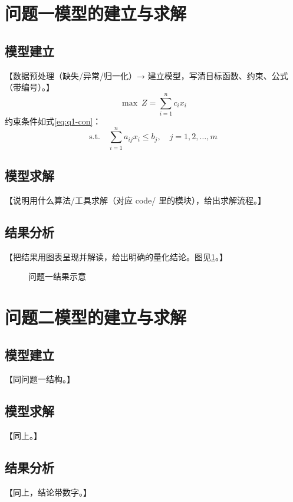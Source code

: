 \documentclass{cumcmthesis}
\begin{document}
\section{问题一模型的建立与求解}
\subsection{模型建立}
【数据预处理（缺失/异常/归一化）→ 建立模型，写清目标函数、约束、公式（带编号）。】
\begin{equation}
    \max\ Z = \sum_{i=1}^{n} c_i x_i
    \label{eq:q1-obj}
\end{equation}
约束条件如式\cref{eq:q1-con}：
\begin{equation}
    \text{s.t.}\quad \sum_{i=1}^{n} a_{ij} x_i \le b_j,\quad j=1,2,\dots,m
    \label{eq:q1-con}
\end{equation}

\subsection{模型求解}
【说明用什么算法/工具求解（对应 code/ 里的模块），给出求解流程。】

\subsection{结果分析}
【把结果用图表呈现并解读，给出明确的量化结论。图见\cref{fig:q1}。】
\begin{figure}[!htbp]
    \centering
    \caption{问题一结果示意}
    \label{fig:q1}
\end{figure}

\section{问题二模型的建立与求解}
\subsection{模型建立}
【同问题一结构。】
\subsection{模型求解}
【同上。】
\subsection{结果分析}
【同上，结论带数字。】
\end{document}
